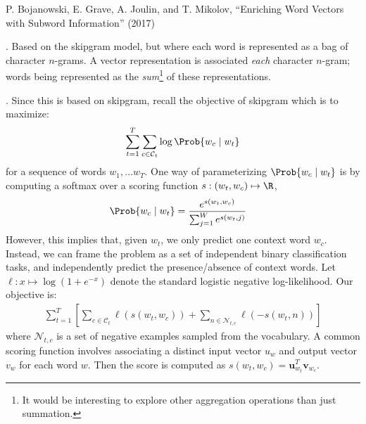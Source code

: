 \documentclass[11pt]{article}
\renewcommand\vec[2][]{\bm{#2}_{#1}}
\newcommand\myspace[1][]{\vspace{#1\bigskipamount}}
\newcommand\p{\Needspace{10\baselineskip} \noindent}
\begin{document}
\vspace{-1em}
{\footnotesize P. Bojanowski, E. Grave, A. Joulin, and T. Mikolov, ``Enriching Word Vectors with Subword Information'' (2017)}

\myspace
\p {}. Based on the skipgram model, but where each word is represented as a bag of character $n$-grams. A vector representation is associated \textit{each} character $n$-gram; words being represented as the \textit{sum}\footnote{It would be interesting to explore other aggregation operations than just summation.} of these representations.

\myspace
\p {}. Since this is based on skipgram, recall the objective of skipgram which is to maximize:
\begin{align}
	\sum_{t = 1}^T \sum_{c \in \mathcal{C}_t} \log \Prob{w_c \mid w_t}
\end{align}
for a sequence of words $w_1, \ldots w_T$. One way of parameterizing $\Prob{w_c \mid w_t}$ is by computing a softmax over a scoring function $s: (w_t, w_c) \mapsto \R$,
\begin{align}
	\Prob{w_c \mid w_t} &= \frac{
			e^{s(w_t, w_c)}  }{
			\sum_{j = 1}^{W} e^{s(w_t, j)}
			}
\end{align}
However, this implies that, given $w_t$, we only predict one context word $w_c$. Instead, we can frame the problem as a set of independent binary classification tasks, and independently predict the presence/absence of context words. Let $\ell: x \mapsto \log(1 + e^{-x})$ denote the standard logistic negative log-likelihood. Our objective is:
\begin{align}
	\sum_{t = 1}^T \left[
		\sum_{c \in \mathcal{C}_t} \ell(s(w_t, w_c)) + \sum_{n \in \mathcal{N}_{t,c}} \ell(-s(w_t, n))
	\right]
\end{align}
where $\mathcal{N}_{t,c}$ is a set of negative examples sampled from the vocabulary. A common scoring function involves associating a distinct input vector $u_w$ and output vector $v_w$ for each word $w$. Then the score is computed as $s(w_t, w_c) = \vec[w_t]{u}^T \vec[w_c]{v}$. 
\end{document}
